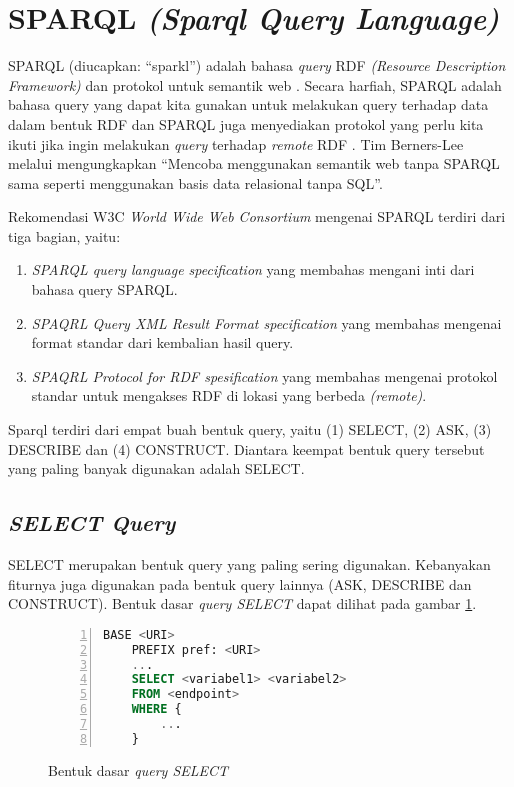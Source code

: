 \section{SPARQL \emph{(Sparql Query Language)}}
SPARQL (diucapkan: ``sparkl'') adalah bahasa \emph{query} RDF \emph{(Resource Description Framework)} dan protokol untuk semantik web \citep{liyang_yu}. Secara harfiah, SPARQL adalah bahasa query yang dapat kita gunakan untuk melakukan query terhadap data dalam bentuk RDF dan SPARQL juga menyediakan protokol yang perlu kita ikuti jika ingin melakukan \emph{query} terhadap \emph{remote} RDF \citep{liyang_yu}. Tim Berners-Lee melalui \citet{ducharme} mengungkapkan ``Mencoba menggunakan semantik web tanpa SPARQL sama seperti menggunakan basis data relasional tanpa SQL''.

Rekomendasi W3C \emph{World Wide Web Consortium} mengenai SPARQL terdiri dari tiga bagian, yaitu:

\begin{enumerate}
	\item \emph{SPARQL query language specification} yang membahas mengani inti dari bahasa query SPARQL.
	\item \emph{SPAQRL Query XML Result Format specification} yang membahas mengenai format standar dari kembalian hasil query.
	\item \emph{SPAQRL Protocol for RDF spesification} yang membahas mengenai protokol standar untuk mengakses RDF di lokasi yang berbeda \emph{(remote)}.
\end{enumerate}

Sparql terdiri dari empat buah bentuk query, yaitu (1) SELECT, (2) ASK, (3) DESCRIBE dan (4) CONSTRUCT. Diantara keempat bentuk query tersebut yang paling banyak digunakan adalah SELECT.

\subsection{\emph{SELECT Query}}
SELECT merupakan bentuk query yang paling sering digunakan. Kebanyakan fiturnya juga digunakan pada bentuk query lainnya (ASK, DESCRIBE dan CONSTRUCT). Bentuk dasar \emph{query SELECT} dapat dilihat pada gambar \ref{fig:bentuk_query_select}.
\begin{figure}[hb]
	\centering
	\begin{lstlisting}[language=SQL, xleftmargin=15pt, numbers=left]
 	BASE <URI>
 	PREFIX pref: <URI>
 	...
 	SELECT <variabel1> <variabel2>
 	FROM <endpoint>
 	WHERE {
 		...
 	}\end{lstlisting} 
	\caption{Bentuk dasar \emph{query SELECT} \citep{liyang_yu}}
	\label{fig:bentuk_query_select}
\end{figure}

